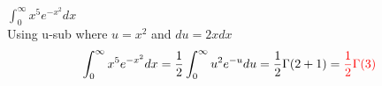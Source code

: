\item [11.] $\int_0^\infty x^5e^{-x^2}dx$
\\[2mm]Using u-sub where $u = x^2$ and $du = 2xdx$
\[
    \int_0^\infty x^5e^{-x^2}dx=\frac{1}{2}\int_0^\infty u^2e^{-u}du=\frac{1}{2}\Gamma(2+1)=
    \textcolor{red}{\frac{1}{2}\Gamma(3)}
\]